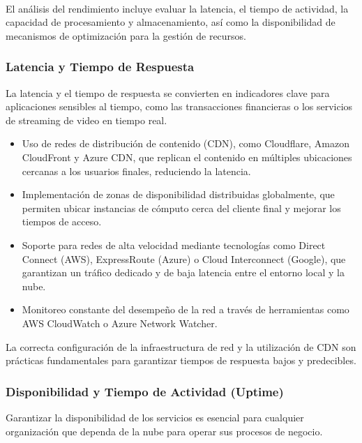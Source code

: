 {            \paragraph{}El análisis del rendimiento incluye evaluar la latencia, el tiempo de actividad, la capacidad de procesamiento y almacenamiento, así como la disponibilidad de mecanismos de optimización para la gestión de recursos.
                
            \subsubsection{Latencia y Tiempo de Respuesta}
                La latencia y el tiempo de respuesta se convierten en indicadores clave para aplicaciones sensibles al tiempo, como las transacciones financieras o los servicios de streaming de video en tiempo real.
                
                \begin{itemize}
                    \item Uso de redes de distribución de contenido (CDN), como Cloudflare, Amazon CloudFront y Azure CDN, que replican el contenido en múltiples ubicaciones cercanas a los usuarios finales, reduciendo la latencia.
                    \item Implementación de zonas de disponibilidad distribuidas globalmente, que permiten ubicar instancias de cómputo cerca del cliente final y mejorar los tiempos de acceso.
                    \item Soporte para redes de alta velocidad mediante tecnologías como Direct Connect (AWS), ExpressRoute (Azure) o Cloud Interconnect (Google), que garantizan un tráfico dedicado y de baja latencia entre el entorno local y la nube.
                    \item Monitoreo constante del desempeño de la red a través de herramientas como AWS CloudWatch o Azure Network Watcher.
                \end{itemize}
                
                La correcta configuración de la infraestructura de red y la utilización de CDN son prácticas fundamentales para garantizar tiempos de respuesta bajos y predecibles.
                
            \subsubsection{Disponibilidad y Tiempo de Actividad (Uptime)}
                Garantizar la disponibilidad de los servicios es esencial para cualquier organización que dependa de la nube para operar sus procesos de negocio.
                
}
